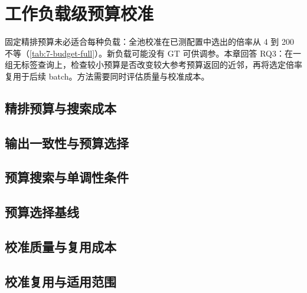 \chapter{工作负载级预算校准}
\label{ch:refinement}
固定精排预算未必适合每种负载：全池校准在已测配置中选出的倍率从 4 到 200 不等（\cref{tab:7-budget-full}）。新负载可能没有 GT 可供调参。本章回答 RQ3：在一组无标签查询上，检查较小预算是否改变较大参考预算返回的近邻，再将选定倍率复用于后续 batch。方法需要同时评估质量与校准成本。

\section{精排预算与搜索成本}
\label{sec:6-1}


\section{输出一致性与预算选择}
\label{sec:6-2}


\section{预算搜索与单调性条件}
\label{sec:6-3}


\section{预算选择基线}
\label{sec:6-4}


\section{校准质量与复用成本}
\label{sec:6-5}


\par\medskip\noindent\begin{minipage}{\linewidth}
\setlength{\parindent}{2em}
\section{校准复用与适用范围}
\label{sec:6-6}

\end{minipage}\par
